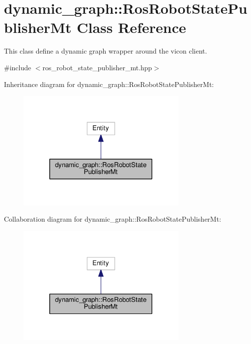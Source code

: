 \hypertarget{classdynamic__graph_1_1RosRobotStatePublisherMt}{}\section{dynamic\+\_\+graph\+:\+:Ros\+Robot\+State\+Publisher\+Mt Class Reference}
\label{classdynamic__graph_1_1RosRobotStatePublisherMt}


This class define a dynamic graph wrapper around the vicon client.  




{\ttfamily \#include $<$ros\+\_\+robot\+\_\+state\+\_\+publisher\+\_\+mt.\+hpp$>$}



Inheritance diagram for dynamic\+\_\+graph\+:\+:Ros\+Robot\+State\+Publisher\+Mt\+:\nopagebreak
\begin{figure}[H]
\begin{center}
\leavevmode
\includegraphics[width=236pt]{classdynamic__graph_1_1RosRobotStatePublisherMt__inherit__graph}
\end{center}
\end{figure}


Collaboration diagram for dynamic\+\_\+graph\+:\+:Ros\+Robot\+State\+Publisher\+Mt\+:\nopagebreak
\begin{figure}[H]
\begin{center}
\leavevmode
\includegraphics[width=236pt]{classdynamic__graph_1_1RosRobotStatePublisherMt__coll__graph}
\end{center}
\end{figure}
